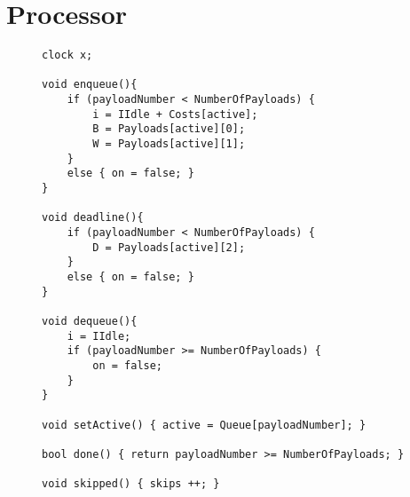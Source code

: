 \section{Processor}

\begin{figure}[H]
\begin{lstlisting}[language=my_c, caption={Declarations for Processor template}, label=lst:processor_code]
clock x;

void enqueue(){
	if (payloadNumber < NumberOfPayloads) {
		i = IIdle + Costs[active];
		B = Payloads[active][0];
		W = Payloads[active][1];
	}
	else { on = false; }
}

void deadline(){
	if (payloadNumber < NumberOfPayloads) {
		D = Payloads[active][2];
	}
	else { on = false; }
}

void dequeue(){
	i = IIdle;
	if (payloadNumber >= NumberOfPayloads) {
		on = false;
	}
}

void setActive() { active = Queue[payloadNumber]; }

bool done() { return payloadNumber >= NumberOfPayloads; }

void skipped() { skips ++; }
\end{lstlisting}
\end{figure}
